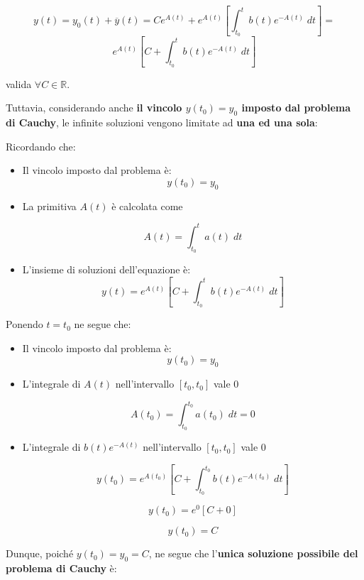 \documentclass[a4paper, 12pt]{report}
\begin{document}
    \[ y(t) = y_0(t) + \overline{y}(t) = Ce^{A(t)} + e^{A(t)} \left [ \int_{t_0}^{t} b(t)e^{-A(t)} \; dt \right ] = \]
    \[ e^{A(t)} \left [ C + \int_{t_0}^{t} b(t)e^{-A(t)} \; dt \right ]\]
    
    valida $\forall C \in \mathbb{R}$.
    
    \quad
    
    Tuttavia, considerando anche \textbf{il vincolo $y(t_0) = y_0$ imposto dal problema di Cauchy}, le infinite soluzioni vengono limitate ad \textbf{una ed una sola}:
    
    Ricordando che:
    \begin{itemize}
        \item Il vincolo imposto dal problema è:
        \[ y(t_0) = y_0 \]
        
        \item La primitiva $A(t)$ è calcolata come
        
        \[ A(t) = \int_{t_0}^{t} a(t) \; dt\]
        
        \item L'insieme di soluzioni dell'equazione è:
        \[ y(t) = e^{A(t)} \left [ C + \int_{t_0}^{t} b(t)e^{-A(t)} \; dt \right ] \]
        
    \end{itemize}
    
    Ponendo $t = t_0$ ne segue che:
    \begin{itemize}
        \item Il vincolo imposto dal problema è:
        \[ y(t_0) = y_0 \]
        
        \item L'integrale di $A(t)$ nell'intervallo $[t_0, t_0]$ vale 0
        
        \[ A(t_0) = \int_{t_0}^{t_0} a(t_0) \; dt = 0\]
        
        \item L'integrale di $b(t)e^{-A(t)}$ nell'intervallo $[t_0, t_0]$ vale 0
        
        \[ y(t_0) = e^{A(t_0)} \left [ C + \int_{t_0}^{t_0} b(t)e^{-A(t_0)} \; dt \right ] \]
        
        \[ y(t_0) = e^{0} [ C + 0] \]
        
        
        \[ y(t_0) = C \]
        
    \end{itemize}
    
    Dunque, poiché $y(t_0) = y_0 = C$, ne segue che l'\textbf{unica soluzione possibile del problema di Cauchy} è:
    
\end{document}
